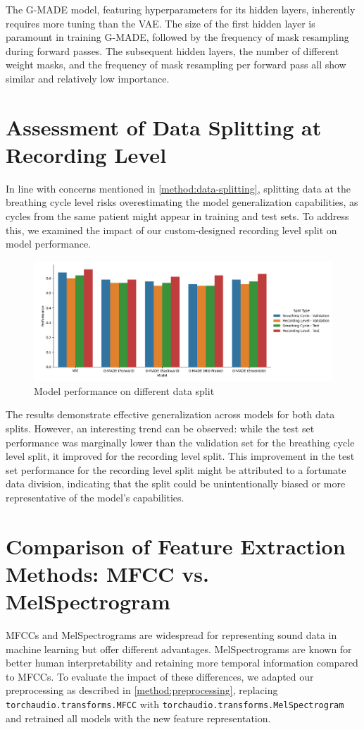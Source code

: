 The G-MADE model, featuring hyperparameters for its hidden layers, inherently requires more tuning than the VAE. The size of the first hidden layer is paramount in training G-MADE, followed by the frequency of mask resampling during forward passes. The subsequent hidden layers, the number of different weight masks, and the frequency of mask resampling per forward pass all show similar and relatively low importance.

\section{Assessment of Data Splitting at Recording Level}
In line with concerns mentioned in \autoref{method:data-splitting}, splitting data at the breathing cycle level risks overestimating the model generalization capabilities, as cycles from the same patient might appear in training and test sets. To address this, we examined the impact of our custom-designed recording level split on model performance.

\begin{figure}[h!]
    \includegraphics[width=\linewidth]{images/split_performance}
    \caption{
    Model performance on different data split
}
\end{figure}

The results demonstrate effective generalization across models for both data splits. However, an interesting trend can be observed: while the test set performance was marginally lower than the validation set for the breathing cycle level split, it improved for the recording level split. This improvement in the test set performance for the recording level split might be attributed to a fortunate data division, indicating that the split could be unintentionally biased or more representative of the model's capabilities.

\section{Comparison of Feature Extraction Methods: MFCC vs. MelSpectrogram}
MFCCs and MelSpectrograms are widespread for representing sound data in machine learning but offer different advantages. MelSpectrograms are known for better human interpretability and retaining more temporal information compared to MFCCs. To evaluate the impact of these differences, we adapted our preprocessing as described in \autoref{method:preprocessing}, replacing \lstinline{torchaudio.transforms.MFCC} with \lstinline{torchaudio.transforms.MelSpectrogram} and retrained all models with the new feature representation.

